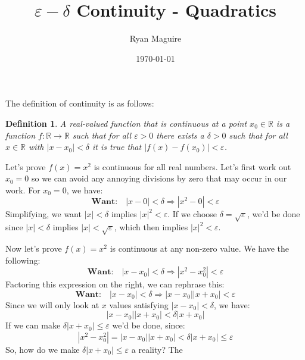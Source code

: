 \documentclass{article}
\title{$\varepsilon-\delta$ Continuity - Quadratics}
\author{Ryan Maguire}
\date{\today}
\theoremstyle{normal}
\newtheorem{definition}{Definition}
\begin{document}
    \maketitle
    The definition of continuity is as follows:
    \begin{definition}
        A real-valued function that is continuous at a point
        $x_{0}\in\mathbb{R}$ is a function $f:\mathbb{R}\rightarrow\mathbb{R}$
        such that for all $\varepsilon>0$ there exists a $\delta>0$ such that
        for all $x\in\mathbb{R}$ with $|x-x_{0}|<\delta$ it is true that
        $|f(x)-f(x_{0})|<\varepsilon$.
    \end{definition}
    Let's prove $f(x)=x^{2}$ is continuous for all real numbers. Let's first
    work out $x_{0}=0$ so we can avoid any annoying divisions by zero that may
    occur in our work. For $x_{0}=0$, we have:
    \begin{equation}
        \textbf{Want:}\quad
        |x-0|<\delta
        \Rightarrow|x^{2}-0|<\varepsilon
    \end{equation}
    Simplifying, we want $|x|<\delta$ implies $|x|^{2}<\varepsilon$. If we
    choose $\delta=\sqrt{\varepsilon}$, we'd be done since
    $|x|<\delta$ implies $|x|<\sqrt{\varepsilon}$, which then implies
    $|x|^{2}<\varepsilon$.
    \par\hfill\par
    Now let's prove $f(x)=x^{2}$ is continuous at any non-zero value. We have
    the following:
    \begin{equation}
        \textbf{Want:}\quad
        |x-x_{0}|<\delta
        \Rightarrow|x^{2}-x_{0}^{2}|<\varepsilon
    \end{equation}
    Factoring this expression on the right, we can rephrase this:
    \begin{equation}
        \textbf{Want:}\quad
        |x-x_{0}|<\delta
        \Rightarrow
        |x-x_{0}||x+x_{0}|<\varepsilon
    \end{equation}
    Since we will only look at $x$ values satisfying $|x-x_{0}|<\delta$,
    we have:
    \begin{equation}
        |x-x_{0}||x+x_{0}|<\delta|x+x_{0}|
    \end{equation}
    If we can make $\delta|x+x_{0}|\leq\varepsilon$ we'd be done, since:
    \begin{equation}
        |x^{2}-x_{0}^{2}|=|x-x_{0}||x+x_{0}|
        <\delta|x+x_{0}|\leq\varepsilon
    \end{equation}
    So, how do we make $\delta|x+x_{0}|\leq\varepsilon$ a reality? The
\end{document}
